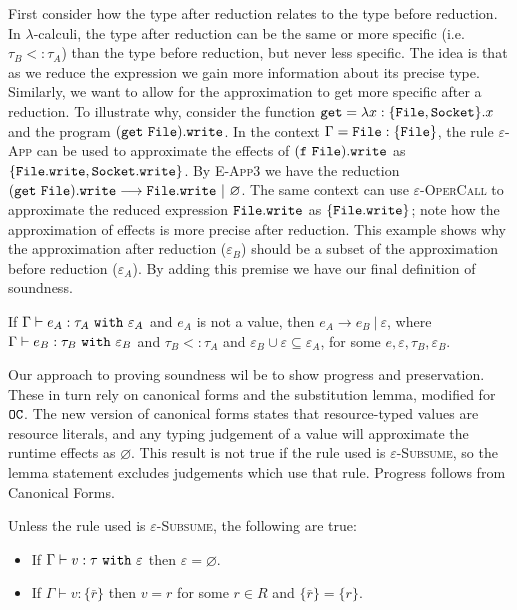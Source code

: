 First consider how the type after reduction relates to the type before reduction. In $\lambda$-calculi, the type after reduction can be the same or more specific (i.e. $\tau_B <: \tau_A$) than the type before reduction, but never less specific. The idea is that as we reduce the expression we gain more information about its precise type. Similarly, we want to allow for the approximation to get more specific after a reduction. To illustrate why, consider the function $\mathtt{get} = \lambda x: \{ \mathtt{File, Socket} \} .x$ and the program $\mathtt{(get~File).write}$. In the context $\Gamma = \mathtt{File: \{ File \}}$, the rule \textsc{$\varepsilon$-App} can be used to approximate the effects of $\mathtt{(f~File).write}$ as $\{ \mathtt{File.write, Socket.write} \}$. By \textsc{E-App3} we have the reduction $\mathtt{(get~File).write} \longrightarrow \mathtt{File.write}~|~\varnothing$. The same context can use \textsc{$\varepsilon$-OperCall} to approximate the reduced expression $\mathtt{File.write}$ as $\{ \mathtt{File.write} \}$; note how the approximation of effects is more precise after reduction. This example shows why the approximation after reduction ($\varepsilon_B$) should be a subset of the approximation before reduction ($\varepsilon_A$). By adding this premise we have our final definition of soundness.

\begin{theorem}
If $ \Gamma \vdash  e_A:  \tau_A~\mathtt{with}~ \varepsilon_A$ and $ e_A$ is not a value, then $e_A \longrightarrow e_B~|~\varepsilon$, where $ \Gamma \vdash e_B:  \tau_B~\mathtt{with}~ \varepsilon_B$ and $ \tau_B <:  \tau_A$ and $\varepsilon_B \cup \varepsilon \subseteq \varepsilon_A$, for some $e, \varepsilon, \tau_B, \varepsilon_B$.
\end{theorem}

Our approach to proving soundness wil be to show progress and preservation. These in turn rely on canonical forms and the substitution lemma, modified for $\mathtt{OC}$. The new version of canonical forms states that resource-typed values are resource literals, and any typing judgement of a value will approximate the runtime effects as $\varnothing$. This result is not true if the rule used is \textsc{$\varepsilon$-Subsume}, so the lemma statement excludes judgements which use that rule. Progress follows from Canonical Forms.

\begin{lemma}
Unless the rule used is \textsc{$\varepsilon$-Subsume}, the following are true:
\begin{itemize}
	\setlength\itemsep{-0.7em}
	\item If $ \Gamma \vdash  v:  \tau~\mathtt{with}~ \varepsilon$ then $\varepsilon = \varnothing$.
	\item If $ \Gamma \vdash  v: \{ \bar r \}$ then $ v = r$ for some $r \in R$ and $\{ \bar r \} = \{ r \}$.
\end{itemize}
\end{lemma}

